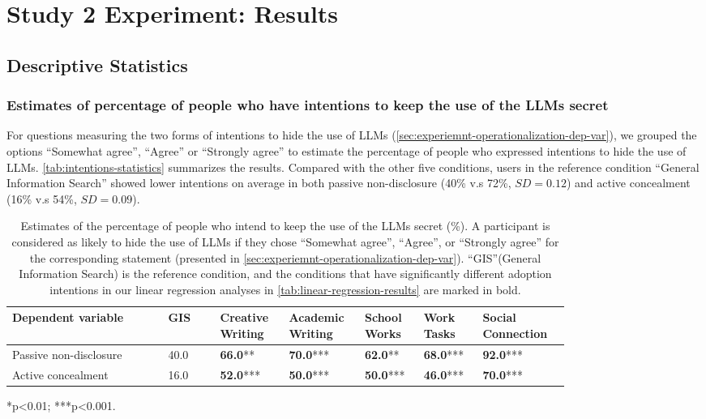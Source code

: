 \section{Study 2 Experiment: Results}


\subsection{Descriptive Statistics}

\subsubsection{Estimates of percentage of people who have intentions to keep the use of the LLMs secret}
\label{sec:desc-stats-secret-use-estimates}

For questions measuring the two forms of intentions to hide the use of LLMs (\autoref{sec:experiemnt-operationalization-dep-var}), we grouped the options ``Somewhat agree'', ``Agree'' or ``Strongly agree'' to estimate the percentage of people who expressed intentions to hide the use of LLMs. 
\autoref{tab:intentions-statistics} summarizes the results. 
Compared with the other five conditions, users in the reference condition ``General Information Search'' showed lower intentions on average in both passive non-disclosure (40\% v.s 72\%, \(SD = 0.12\)) and active concealment (16\% v.s 54\%, \(SD = 0.09\)). 


\begin{table}[]
  \begin{threeparttable}
    \centering
    \caption{Estimates of the percentage of people who intend to keep the use of the LLMs secret (\%). 
    A participant is considered as likely to hide the use of LLMs if they chose ``Somewhat agree'', ``Agree'', or ``Strongly agree'' for the corresponding statement (presented in \autoref{sec:experiemnt-operationalization-dep-var}). 
    ``GIS''(General Information Search) is the reference condition, and the conditions that have significantly different adoption intentions in our linear regression analyses in \autoref{tab:linear-regression-results} are marked in bold.}
    \begin{tabular}{p{0.24\linewidth}p{0.08\linewidth}p{0.1\linewidth}p{0.1\linewidth}p{0.08\linewidth}p{0.08\linewidth}p{0.12\linewidth}}
    \toprule
    Dependent variable&GIS&Creative Writing& Academic Writing & School Works& Work Tasks&Social \newline Connection\\
    \midrule
    Passive non-disclosure&40.0&\textbf{66.0}**& \textbf{70.0}***& \textbf{62.0}**& \textbf{68.0}***&\textbf{92.0}***\\
    Active concealment&16.0&\textbf{52.0}***& \textbf{50.0}***& \textbf{50.0}***& \textbf{46.0}***&\textbf{70.0}***\\
 \bottomrule
    \end{tabular}
    \label{tab:intentions-statistics}
    \begin{tablenotes}
      \small
      \item **p<0.01; ***p<0.001.
    \end{tablenotes}
  \end{threeparttable}
\end{table}


